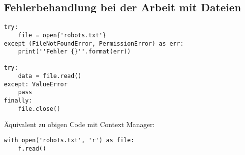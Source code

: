 \subsection{Fehlerbehandlung bei der Arbeit mit Dateien}
\begin{lstlisting}
try:
    file = open{'robots.txt'}
except (FileNotFoundError, PermissionError) as err:
    print(''Fehler {}''.format(err))
    
try:
    data = file.read()
except: ValueError
    pass
finally:
    file.close()
\end{lstlisting}
Äquivalent zu obigen Code mit Context Manager:\\[0.5em]
\begin{lstlisting}
with open('robots.txt', 'r') as file:
    f.read()
\end{lstlisting}

